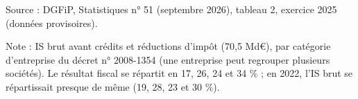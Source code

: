 Source : DGFiP, Statistiques n° 51 (septembre 2026), tableau 2, exercice 2025 (données provisoires).\par Note : IS brut avant crédits et réductions d'impôt (70,5 Md\euro{}), par catégorie d'entreprise du décret n° 2008-1354 (une entreprise peut regrouper plusieurs sociétés). Le résultat fiscal se répartit en 17, 26, 24 et 34 \% ; en 2022, l'IS brut se répartissait presque de même (19, 28, 23 et 30 \%).
